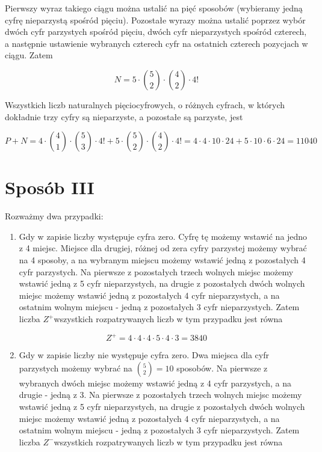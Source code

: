 \documentclass[10pt]{article}
\begin{document}
Pierwszy wyraz takiego ciągu można ustalić na pięć sposobów (wybieramy jedną cyfrę nieparzystą spośród pięciu). Pozostałe wyrazy można ustalić poprzez wybór dwóch cyfr parzystych spośród pięciu, dwóch cyfr nieparzystych spośród czterech, a następnie ustawienie wybranych czterech cyfr na ostatnich czterech pozycjach w ciągu. Zatem

$$
N=5 \cdot\binom{5}{2} \cdot\binom{4}{2} \cdot 4!
$$

Wszystkich liczb naturalnych pięciocyfrowych, o różnych cyfrach, w których dokładnie trzy cyfry są nieparzyste, a pozostałe są parzyste, jest

$$
P+N=4 \cdot\binom{4}{1} \cdot\binom{5}{3} \cdot 4!+5 \cdot\binom{5}{2} \cdot\binom{4}{2} \cdot 4!=4 \cdot 4 \cdot 10 \cdot 24+5 \cdot 10 \cdot 6 \cdot 24=11040
$$

\section*{Sposób III}
Rozważmy dwa przypadki:

\begin{enumerate}
  \item Gdy w zapisie liczby występuje cyfra zero. Cyfrę tę możemy wstawić na jedno z 4 miejsc. Miejsce dla drugiej, różnej od zera cyfry parzystej możemy wybrać na 4 sposoby, a na wybranym miejscu możemy wstawić jedną z pozostałych 4 cyfr parzystych. Na pierwsze z pozostałych trzech wolnych miejsc możemy wstawić jedną z 5 cyfr nieparzystych, na drugie z pozostałych dwóch wolnych miejsc możemy wstawić jedną z pozostałych 4 cyfr nieparzystych, a na ostatnim wolnym miejscu - jedną z pozostałych 3 cyfr nieparzystych. Zatem liczba $Z^{+}$wszystkich rozpatrywanych liczb w tym przypadku jest równa
\end{enumerate}

$$
Z^{+}=4 \cdot 4 \cdot 4 \cdot 5 \cdot 4 \cdot 3=3840
$$

\begin{enumerate}
  \setcounter{enumi}{1}
  \item Gdy w zapisie liczby nie występuje cyfra zero. Dwa miejsca dla cyfr parzystych możemy wybrać na $\binom{5}{2}=10$ sposobów. Na pierwsze z wybranych dwóch miejsc możemy wstawić jedną z 4 cyfr parzystych, a na drugie - jedną z 3. Na pierwsze z pozostałych trzech wolnych miejsc możemy wstawić jedną z 5 cyfr nieparzystych, na drugie z pozostałych dwóch wolnych miejsc możemy wstawić jedną z pozostałych 4 cyfr nieparzystych, a na ostatnim wolnym miejscu - jedną z pozostałych 3 cyfr nieparzystych. Zatem liczba $Z^{-}$wszystkich rozpatrywanych liczb w tym przypadku jest równa
\end{enumerate}
\end{document}
